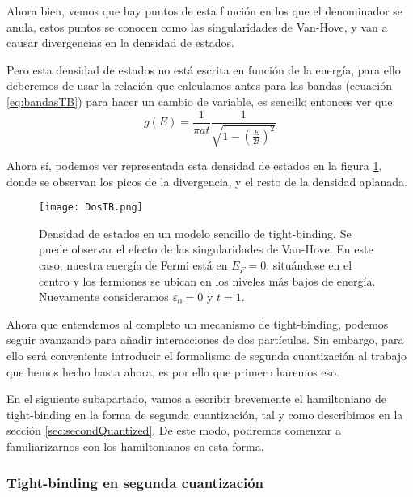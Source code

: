 \documentclass[12pt,twoside]{article}
\begin{document}
Ahora bien, vemos que hay puntos de esta función en los que el denominador se anula, estos puntos se conocen como las singularidades de Van-Hove, y van a causar divergencias en la densidad de estados.

Pero esta densidad de estados no está escrita en función de la energía, para ello deberemos de usar la relación que calculamos antes para las bandas (ecuación \ref{eq:bandasTB}) para hacer un cambio de variable, es sencillo entonces ver que:
\begin{equation}
  g(E) = \frac{1}{\pi at}\frac{1}{\sqrt{1-\left(\frac{E}{2t}\right)^2}}
\end{equation}

Ahora sí, podemos ver representada esta densidad de estados en la figura \ref{fig:dosTB}, donde se observan los picos de la divergencia, y el resto de la densidad aplanada.
\begin{figure}[h!]
  \begin{center}
    \texttt{[image: DosTB.png]}
    \caption{Densidad de estados en un modelo sencillo de tight-binding. Se puede observar el efecto de las singularidades de Van-Hove. En este caso, nuestra energía de Fermi está en $E_F = 0$, situándose en el centro y los fermiones se ubican en los niveles más bajos de energía. Nuevamente consideramos $\varepsilon_0 = 0$ y $t = 1$.}
    \label{fig:dosTB}
  \end{center}
\end{figure}

Ahora que entendemos al completo un mecanismo de tight-binding, podemos seguir avanzando para añadir interacciones de dos partículas. Sin embargo, para ello será conveniente introducir el formalismo de segunda cuantización al trabajo que hemos hecho hasta ahora, es por ello que primero haremos eso.

En el siguiente subapartado, vamos a escribir brevemente el hamiltoniano de tight-binding en la forma de segunda cuantización, tal y como describimos en la sección \ref{sec:secondQuantized}. De este modo, podremos comenzar a familiarizarnos con los hamiltonianos en esta forma.
\subsubsection{Tight-binding en segunda cuantización}
\end{document}
